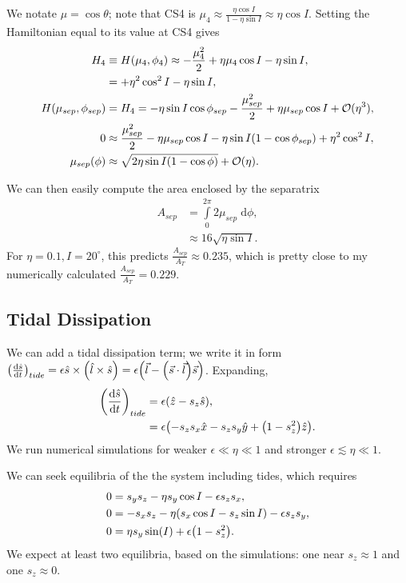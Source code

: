 \documentclass[11pt,
        usenames, %
        dvipsnames %
    ]{article}
\newcommand*{\rd}[2]{\frac{\mathrm{d}#1}{\mathrm{d}#2}}
\DeclarePairedDelimiter\p{\lparen}{\rparen}
\begin{document}
We notate $\mu = \cos\theta$; note that CS4 is $\mu_4 \approx \frac{\eta \cos
I}{1 - \eta \sin I} \approx \eta \cos I$. Setting the Hamiltonian equal to its
value at CS4 gives
\begin{align*}
    H_4 &\equiv H\p*{\mu_4, \phi_4}
        \approx -\frac{\mu_4^2}{2} + \eta \mu_4 \cos I - \eta \sin I,\\
        &= +\eta^2\cos^2 I - \eta \sin I,\\
    H(\mu_{sep}, \phi_{sep})
        &= H_4 = -\eta \sin I \cos \phi_{sep} - \frac{\mu_{sep}^2}{2} + \eta
            \mu_{sep} \cos I + \mathcal{O}(\eta^3),\\
    0 &\approx \frac{\mu_{sep}^2}{2} - \eta \mu_{sep} \cos I
        - \eta \sin I\p*{1 - \cos \phi_{sep}} + \eta^2\cos^2I,\\
    \mu_{sep}\p*{\phi} &\approx \sqrt{2\eta \sin I\p*{1 - \cos \phi}}
        + \mathcal{O}(\eta).
\end{align*}

We can then easily compute the area enclosed by the separatrix
\begin{align}
    A_{sep} &= \int\limits_0^{2\pi}2\mu_{sep}\;\mathrm{d}\phi,\nonumber\\
        &\approx 16\sqrt{\eta \sin I}.
\end{align}
For $\eta = 0.1, I = 20^\circ$, this predicts $\frac{A_{sep}}{A_{T}} \approx
0.235$, which is pretty close to my numerically calculated $\frac{A_{sep}}{A_T}
= 0.229$.

\subsection{Tidal Dissipation}

We can add a tidal dissipation term; we write it in form
$\p*{\rd{\hat{s}}{t}}_{tide} = \epsilon \hat{s} \times \p*{\hat{l} \times
\hat{s}} = \epsilon\p*{\vec{l} - \p*{\vec{s} \cdot \vec{l}}\vec{s}}$. Expanding,
\begin{align}
    \p*{\rd{\hat{s}}{t}}_{tide} &= \epsilon \p*{\hat{z} - s_z\hat{s}}
        ,\nonumber\\
        &= \epsilon \p*{-s_z s_x\hat{x} - s_zs_y\hat{y} + \p*{1 - s_z^2}
            \hat{z}}.
\end{align}
We run numerical simulations for weaker $\epsilon \ll \eta \ll 1$ and stronger
$\epsilon \lesssim \eta \ll 1$.

We can seek equilibria of the the system including tides, which requires
\begin{align*}
    0 &= s_ys_z - \eta s_y\cos I - \epsilon s_zs_x,\\
    0 &= -s_xs_z - \eta\p*{s_x \cos I - s_z \sin I} - \epsilon s_zs_y,\\
    0 &= \eta s_y\sin(I) + \epsilon \p*{1 - s_z^2}.
\end{align*}
We expect at least two equilibria, based on the simulations: one near $s_z
\approx 1$ and one $s_z \approx 0$.
\end{document}
